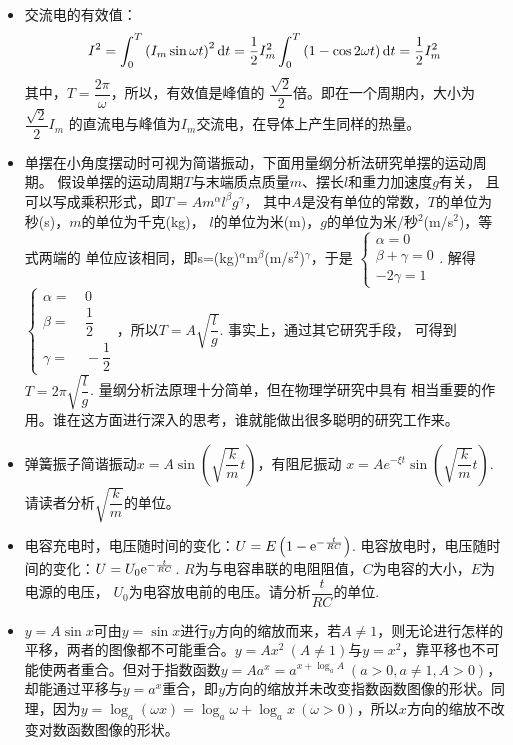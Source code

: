 \begin{itemize}[leftmargin=\inteval{\myitemleftmargin}pt,itemsep=
   \inteval{\myitemitempsep}pt,topsep=\inteval{\myitemtopsep}pt]
\item 交流电的有效值：
\begin{gather*}
I^2=\int_{0}^{T}\left( I_m\sin \omega t\right)^2 \mathrm{d} t
=\dfrac{1}{2}I_m^2 \int_{0}^{T}\left( 1-\cos 2\omega t\right) \mathrm{d} t
=\dfrac{1}{2}I_m^2
\end{gather*}
其中，$ T=\dfrac{2\pi}{\omega} $，所以，有效值是峰值的
$ \dfrac{\sqrt{2}}{2} $倍。即在一个周期内，大小为$ \dfrac{\sqrt{2}}{2}I_m $
的直流电与峰值为$ I_m $交流电，在导体上产生同样的热量。

\item 单摆在小角度摆动时可视为简谐振动，下面用量纲分析法研究单摆的运动周期。
假设单摆的运动周期$ T $与末端质点质量$ m $、摆长$ l $和重力加速度$ g $有关，
且可以写成乘积形式，即$ T=Am^{\alpha}l^{\beta}g^{\gamma} $，
其中$ A $是没有单位的常数，$ T $的单位为秒(s)，$ m $的单位为千克(kg)，
$ l $的单位为米(m)，$ g $的单位为米/秒$ ^2 $(m/s$ ^2 $)，等式两端的
单位应该相同，即s=(kg)$ ^\alpha $m$ ^\beta $(m/s$ ^2 $)$ ^\gamma $，于是
$ \left\{ 
\begin{aligned}
    \alpha=0 \\
    \beta+\gamma =0 \\
    -2\gamma =1
\end{aligned} \right. $. 解得
$ \left\{ 
\begin{aligned}
    \alpha=&\ 0 \\
    \beta=&\ \dfrac{1}{2} \\
    \gamma =&\ -\dfrac{1}{2}
\end{aligned} \right. $，所以$ T=A\sqrt{\dfrac{l}{g}} $. 事实上，通过其它研究手段，
可得到$ T=2\pi \sqrt{\dfrac{l}{g}} $. 量纲分析法原理十分简单，但在物理学研究中具有
相当重要的作用。谁在这方面进行深入的思考，谁就能做出很多聪明的研究工作来。

\item 弹簧振子简谐振动$ x=A\sin\left( \sqrt{\dfrac{k}{m}}t\right) $，有阻尼振动
$ x=Ae^{-\xi t}\sin\left( \sqrt{\dfrac{k}{m}}t\right) $. 
请读者分析$ \sqrt{\dfrac{k}{m}} $的单位。

\item 电容充电时，电压随时间的变化：$ U=E\left(1-\mathrm{e}^{-\frac{t}{RC}} \right) $. 
电容放电时，电压随时间的变化：$ U=U_0\mathrm{e}^{-\frac{t}{RC}}$.
$ R $为与电容串联的电阻阻值，$ C $为电容的大小，$ E $为电源的电压，
$ U_0 $为电容放电前的电压。请分析$ \dfrac{t}{RC} $的单位.

\item $ y=A\sin x $可由$ y=\sin x $进行$ y $方向的缩放而来，若$ A\neq 1 $，则无论进行怎样的平移，两者的图像都不可能重合。$ y=Ax^2\ (A\neq 1) $与$ y=x^2 $，靠平移也不可能使两者重合。但对于指数函数$ y=Aa^x=a^{x+\log_a A}\ (a>0,a\neq 1,A>0) $，却能通过平移与$ y=a^x $重合，即$ y $方向的缩放并未改变指数函数图像的形状。同理，因为$ y=\log_a(\omega x)=\log_a \omega+\log_a x \ (\omega>0) $，所以$ x $方向的缩放不改变对数函数图像的形状。


\end{itemize}
